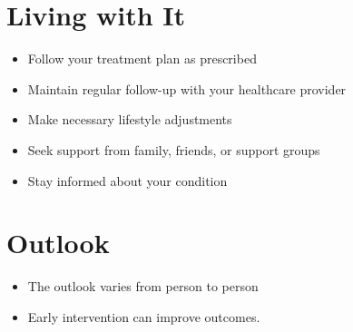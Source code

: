 \section{Living with It}
\begin{itemize}[noitemsep]
  \item Follow your treatment plan as prescribed
  \item Maintain regular follow-up with your healthcare provider
  \item Make necessary lifestyle adjustments
  \item Seek support from family, friends, or support groups
  \item Stay informed about your condition
\end{itemize}
\section{Outlook}
\begin{itemize}[noitemsep]
  \item The outlook varies from person to person
  \item Early intervention can improve outcomes.
\end{itemize}
